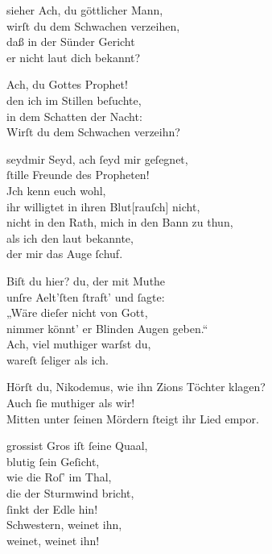 \documentclass[abbrwidth=6em,tocstyle=ref-genre,toe=false]{ees}
\begin{document}
{\begin{movement}{sieher}
  \voice[Joseph]
  Ach, du göttlicher Mann,\\
  wirſt du dem Schwachen verzeihen,\\
  daß in der Sünder Gericht\\
  er nicht laut dich bekannt?

  \voice[Nikodemus]
  Ach, du Gottes Prophet!\\
  den ich im Stillen beſuchte,\\
  in dem Schatten der Nacht:\\
  Wirſt du dem Schwachen verzeihn?
\end{movement}

\begin{movement}{seydmir}
  \voice[Blindgebohrner]
  Seyd, ach ſeyd mir geſegnet,\\
  ſtille Freunde des Propheten!\\
  Jch kenn euch wohl,\\
  ihr willigtet in ihren Blut[rauſch] nicht,\\
  nicht in den Rath, mich in den Bann zu thun,\\
  als ich den laut bekannte,\\
  der mir das Auge ſchuf.

  \voice[Nikodemus]
  Biſt du hier? du, der mit Muthe\\
  unſre Aelt’ſten ſtraft’ und ſagte:\\
  „Wäre dieſer nicht von Gott,\\
  nimmer könnt’ er Blinden Augen geben.“\\
  Ach, viel muthiger warſst du,\\
  wareſt ſeliger als ich.

  \voice[Joseph]
  Hörſt du, Nikodemus, wie ihn Zions Töchter klagen?\\
  Auch ſie muthiger als wir!\\
  Mitten unter ſeinen Mördern ſteigt ihr Lied empor.
\end{movement}

\begin{movement}{grossist}
  Gros iſt ſeine Quaal,\\
  blutig ſein Geſicht,\\
  wie die Roſ’ im Thal,\\
  die der Sturmwind bricht,\\
  ſinkt der Edle hin!\\
  Schwestern, weinet ihn,\\
  weinet, weinet ihn!
\end{movement}

}
\end{document}
